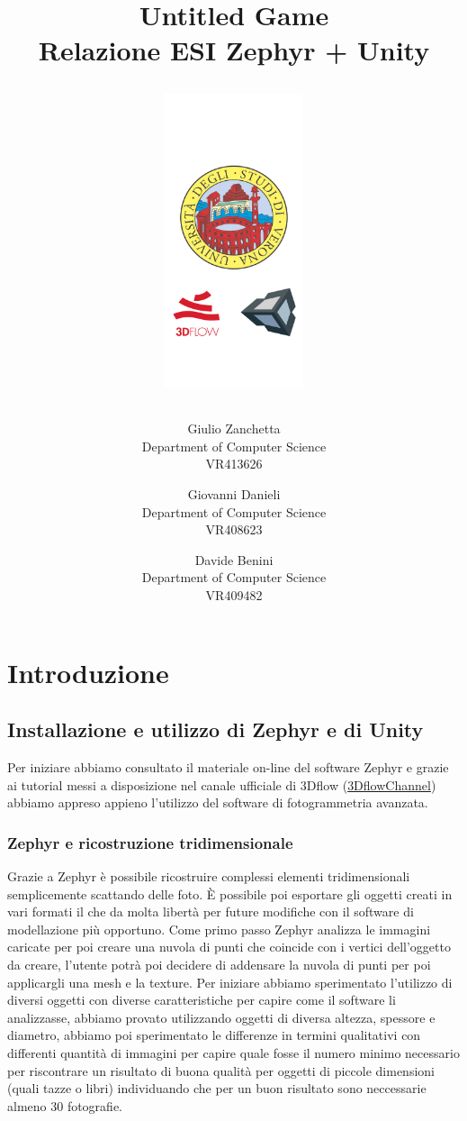 \documentclass[12pt]{report}
\title{\textbf{Untitled Game} \\
    \large Relazione ESI Zephyr + Unity
    \begin{figure}[h!]
  \centering
  \includegraphics[width=41mm]{img/home.png}
\end{figure}
}
\author{
        Giulio Zanchetta \\
        Department of Computer Science\\
        VR413626\\
            \and
        Giovanni Danieli\\
        Department of Computer Science\\
        VR408623\\
            \and
        Davide Benini\\
        Department of Computer Science\\
        VR409482
}
\begin{document}
\clearpage

\addtolength{\topmargin}{-15mm}
\thispagestyle{empty}
\date{}
\maketitle
\clearpage
{} %

\addtolength{\topmargin}{15mm}
\chapter{Introduzione}
\section{Installazione e utilizzo di Zephyr e di Unity}


Per iniziare abbiamo consultato il materiale on-line del software Zephyr e grazie ai tutorial messi a disposizione nel canale ufficiale di 3Dflow (\href{https://www.youtube.com/user/3DflowChannel}{3DflowChannel}) abbiamo appreso appieno l'utilizzo del software di fotogrammetria avanzata.


\subsection {Zephyr e ricostruzione tridimensionale}
Grazie a Zephyr \`e possibile ricostruire complessi elementi tridimensionali semplicemente scattando delle foto. \`E possibile poi esportare gli oggetti creati in vari formati il che da molta libert\`a per future modifiche con il software di modellazione pi\`u opportuno.
Come primo passo Zephyr analizza le immagini caricate per poi creare una nuvola di punti che coincide con i vertici dell'oggetto da creare, l'utente potr\`a poi decidere di addensare la nuvola di punti per poi applicargli una mesh e la texture.
Per iniziare abbiamo sperimentato l'utilizzo di diversi oggetti con diverse caratteristiche per capire come il software li analizzasse, abbiamo provato utilizzando oggetti di diversa altezza, spessore e diametro, abbiamo poi sperimentato le differenze in termini qualitativi con differenti quantit\`a di immagini per capire quale fosse il numero minimo necessario per riscontrare un risultato di buona qualit\`a per oggetti di piccole dimensioni (quali tazze o libri) individuando che per un buon risultato sono neccessarie almeno 30 fotografie.
\end{document}
